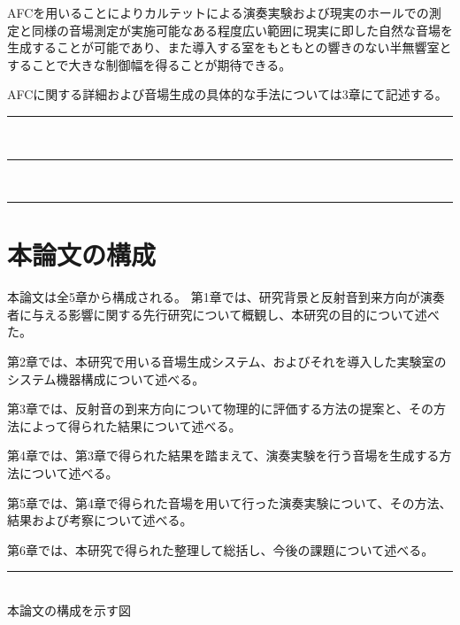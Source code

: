 \documentclass[11pt,a4j]{jreport}
\begin{document}
AFCを用いることによりカルテットによる演奏実験および現実のホールでの測定と同様の音場測定が実施可能なある程度広い範囲に現実に即した自然な音場を生成することが可能であり、また導入する室をもともとの響きのない半無響室とすることで大きな制御幅を得ることが期待できる。

AFCに関する詳細および音場生成の具体的な手法については3章にて記述する。

\lipsum[1-6]
\newpage
\rule{8cm}{6cm}\\
\rule{8cm}{6cm}\\
\rule{8cm}{6cm}

\clearpage
\section{本論文の構成} %
本論文は全5章から構成される。
第1章では、研究背景と反射音到来方向が演奏者に与える影響に関する先行研究について概観し、本研究の目的について述べた。

第2章では、本研究で用いる音場生成システム、およびそれを導入した実験室のシステム機器構成について述べる。

第3章では、反射音の到来方向について物理的に評価する方法の提案と、その方法によって得られた結果について述べる。

第4章では、第3章で得られた結果を踏まえて、演奏実験を行う音場を生成する方法について述べる。

第5章では、第4章で得られた音場を用いて行った演奏実験について、その方法、結果および考察について述べる。

第6章では、本研究で得られた整理して総括し、今後の課題について述べる。

\lipsum[1-2]

\newpage
\rule{15cm}{21cm}\\
本論文の構成を示す図

\cleardoublepage


\end{document}
